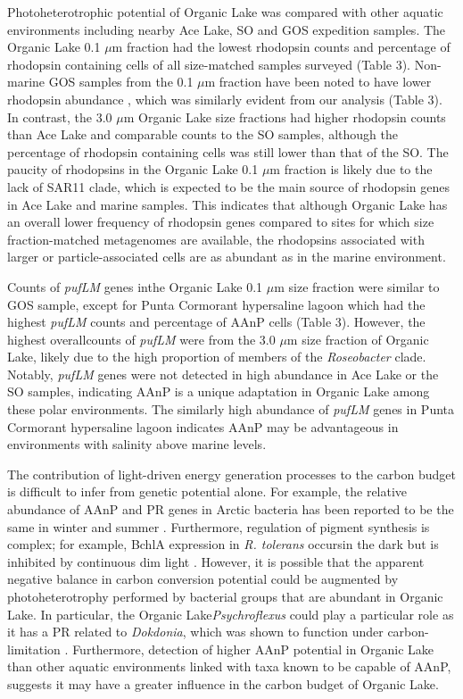 {{Photoheterotrophic potential of Organic Lake was compared with other aquatic environments including nearby Ace Lake, \ac{SO} and \ac{GOS} expedition samples. 
The Organic Lake 0.1 $\mu$m fraction had the lowest rhodopsin counts and percentage of rhodopsin containing cells of all size-matched samples surveyed (Table 3). 
Non-marine \ac{GOS} samples from the 0.1 $\mu$m fraction have been noted to have lower rhodopsin abundance \cite{Sharma2008}, which was similarly evident from our analysis (Table 3). 
In contrast, the 3.0 $\mu$m Organic Lake size fractions had higher rhodopsin counts than Ace Lake and comparable counts to the \ac{SO} samples, although the percentage of rhodopsin containing cells was still lower than that of the \ac{SO}. 
The paucity of rhodopsins in the Organic Lake 0.1 $\mu$m fraction is likely due to the lack of SAR11 clade, which is expected to be the main source of rhodopsin genes in Ace Lake and marine samples. 
This indicates that although Organic Lake has an overall lower frequency of rhodopsin genes compared to sites for which size fraction-matched metagenomes are available, the rhodopsins associated with larger or particle-associated cells are as abundant as in the marine environment.

Counts of \emph{pufLM} genes inthe Organic Lake 0.1 $\mu$m size fraction were similar to \ac{GOS} sample, except for Punta Cormorant hypersaline lagoon which had the highest \emph{pufLM} counts and percentage of \ac{AAnP} cells (Table 3). 
However, the highest overallcounts of \emph{pufLM} were from the 3.0 $\mu$m size fraction of Organic Lake, likely due to the high proportion of members of the \emph{Roseobacter} clade. 
Notably, \emph{pufLM} genes were not detected in high abundance in Ace Lake or the \ac{SO} samples, indicating \ac{AAnP} is a unique adaptation in Organic Lake among these polar environments. 
The similarly high abundance of \emph{pufLM} genes in Punta Cormorant hypersaline lagoon indicates \ac{AAnP} may be advantageous in environments with salinity above marine levels.

The contribution of light-driven energy generation processes to the carbon budget is difficult to infer from genetic potential alone. 
For example, the relative abundance of \ac{AAnP} and \ac{PR} genes in Arctic bacteria has been reported to be the same in winter and summer \cite{Cottrell2002}. 
Furthermore, regulation of pigment synthesis is complex; for example, \ac{BchlA} expression in \emph{R. tolerans} occursin the dark but is inhibited by continuous dim light \cite{Labrenz1999}. 
However, it is possible that the apparent negative balance in carbon conversion potential could be augmented by photoheterotrophy performed by bacterial groups that are abundant in Organic Lake. 
In particular, the Organic Lake\emph{Psychroflexus} could play a particular role as it has a \ac{PR} related to \emph{Dokdonia}, which was shown to function under carbon-limitation \cite{Gomez-Consarnau2007}.
Furthermore, detection of higher \ac{AAnP} potential in Organic Lake than other aquatic environments linked with taxa known to be capable of \ac{AAnP}, suggests it may have a greater influence in the carbon budget of Organic Lake.

}}
